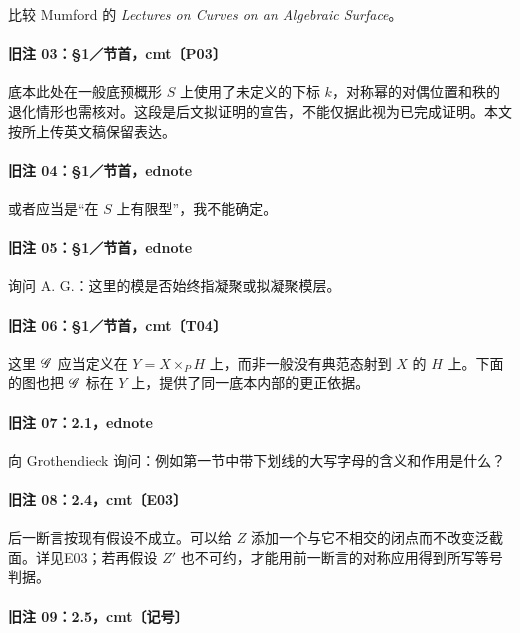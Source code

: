 比较 Mumford 的 \textit{Lectures on Curves on an Algebraic Surface}。

\paragraph{旧注 03：§1／节首，cmt〔P03〕}

底本此处在一般底预概形 $S$ 上使用了未定义的下标 $k$，对称幂的对偶位置和秩的退化情形也需核对。这段是后文拟证明的宣告，不能仅据此视为已完成证明。本文按所上传英文稿保留表达。

\paragraph{旧注 04：§1／节首，ednote}

或者应当是“在 $S$ 上有限型”，我不能确定。

\paragraph{旧注 05：§1／节首，ednote}

询问 A. G.：这里的模是否始终指凝聚或拟凝聚模层。

\paragraph{旧注 06：§1／节首，cmt〔T04〕}

这里 $\mathscr G$ 应当定义在 $Y=X\times_PH$ 上，而非一般没有典范态射到 $X$ 的 $H$ 上。下面的图也把 $\mathscr G$ 标在 $Y$ 上，提供了同一底本内部的更正依据。

\paragraph{旧注 07：2.1，ednote}

向 Grothendieck 询问：例如第一节中带下划线的大写字母的含义和作用是什么？

\paragraph{旧注 08：2.4，cmt〔E03〕}

后一断言按现有假设不成立。可以给 $Z$ 添加一个与它不相交的闭点而不改变泛截面。详见E03；若再假设 $Z'$ 也不可约，才能用前一断言的对称应用得到所写等号判据。

\paragraph{旧注 09：2.5，cmt〔记号〕}

